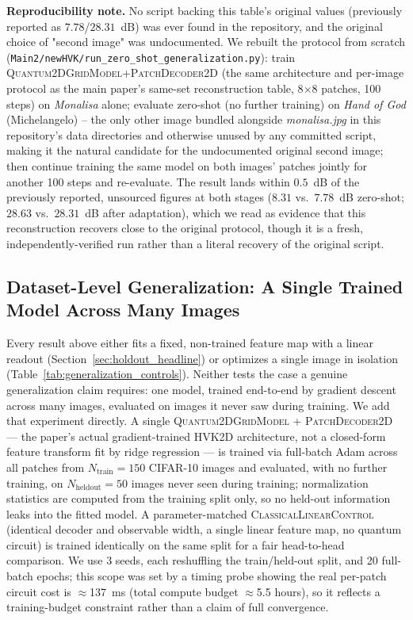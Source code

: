 \documentclass[11pt]{article}
\begin{document}
\textbf{Reproducibility note.} No script backing this table's original values (previously reported as $7.78$/$28.31$~dB) was ever found in the repository, and the original choice of "second image" was undocumented. We rebuilt the protocol from scratch (\texttt{Main2/newHVK/run\_zero\_shot\_generalization.py}): train \textsc{Quantum2DGridModel}+\textsc{PatchDecoder2D} (the same architecture and per-image protocol as the main paper's same-set reconstruction table, 8$\times$8 patches, 100 steps) on \textit{Monalisa} alone; evaluate zero-shot (no further training) on \textit{Hand of God} (Michelangelo) -- the only other image bundled alongside \textit{monalisa.jpg} in this repository's data directories and otherwise unused by any committed script, making it the natural candidate for the undocumented original second image; then continue training the same model on both images' patches jointly for another 100 steps and re-evaluate. The result lands within $0.5$~dB of the previously reported, unsourced figures at both stages ($8.31$ vs.\ $7.78$~dB zero-shot; $28.63$ vs.\ $28.31$~dB after adaptation), which we read as evidence that this reconstruction recovers close to the original protocol, though it is a fresh, independently-verified run rather than a literal recovery of the original script.

\subsection{Dataset-Level Generalization: A Single Trained Model Across Many Images}
\label{sec:dataset_level_generalization}
Every result above either fits a fixed, non-trained feature map with a linear readout (Section~\ref{sec:holdout_headline}) or optimizes a single image in isolation (Table~\ref{tab:generalization_controls}). Neither tests the case a genuine generalization claim requires: one model, trained end-to-end by gradient descent across many images, evaluated on images it never saw during training. We add that experiment directly. A single \textsc{Quantum2DGridModel} + \textsc{PatchDecoder2D} --- the paper's actual gradient-trained HVK2D architecture, not a closed-form feature transform fit by ridge regression --- is trained via full-batch Adam across all patches from $N_{\text{train}}=150$ CIFAR-10 images and evaluated, with no further training, on $N_{\text{heldout}}=50$ images never seen during training; normalization statistics are computed from the training split only, so no held-out information leaks into the fitted model. A parameter-matched \textsc{ClassicalLinearControl} (identical decoder and observable width, a single linear feature map, no quantum circuit) is trained identically on the same split for a fair head-to-head comparison. We use 3 seeds, each reshuffling the train/held-out split, and 20 full-batch epochs; this scope was set by a timing probe showing the real per-patch circuit cost is $\approx$137~ms (total compute budget $\approx$5.5 hours), so it reflects a training-budget constraint rather than a claim of full convergence.
\end{document}
